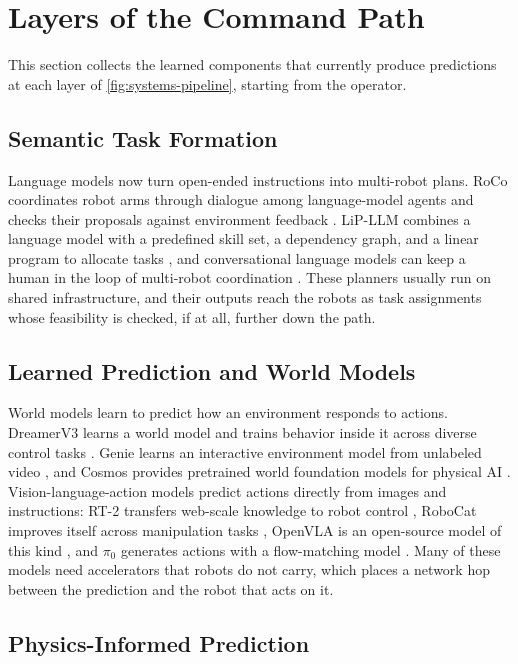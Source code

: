 \section{Layers of the Command Path}
\label{sec:layers}

This section collects the learned components that currently produce predictions
at each layer of \cref{fig:systems-pipeline}, starting from the operator.

\subsection{Semantic Task Formation}

Language models now turn open-ended instructions into multi-robot plans.  RoCo
coordinates robot arms through dialogue among language-model agents and checks
their proposals against environment feedback \cite{mandi2023roco}.  LiP-LLM
combines a language model with a predefined skill set, a dependency graph, and a
linear program to allocate tasks \cite{obata2024lipllm}, and conversational
language models can keep a human in the loop of multi-robot coordination
\cite{hunt2024conversational}.  These planners usually run on shared
infrastructure, and their outputs reach the robots as task assignments whose
feasibility is checked, if at all, further down the path.

\subsection{Learned Prediction and World Models}

World models learn to predict how an environment responds to actions.  DreamerV3
learns a world model and trains behavior inside it across diverse control tasks
\cite{hafner2023dreamerv3}.  Genie learns an interactive environment model from
unlabeled video \cite{bruce2024genie}, and Cosmos provides pretrained world
foundation models for physical AI \cite{nvidia2025cosmos}.  Vision-language-action
models predict actions directly from images and instructions: RT-2 transfers
web-scale knowledge to robot control \cite{brohan2023rt2}, RoboCat improves
itself across manipulation tasks \cite{bousmalis2023robocat}, OpenVLA is an
open-source model of this kind \cite{kim2024openvla}, and $\pi_0$ generates
actions with a flow-matching model \cite{black2024pi0}.  Many of these models
need accelerators that robots do not carry, which places a network hop between
the prediction and the robot that acts on it.

\subsection{Physics-Informed Prediction}

